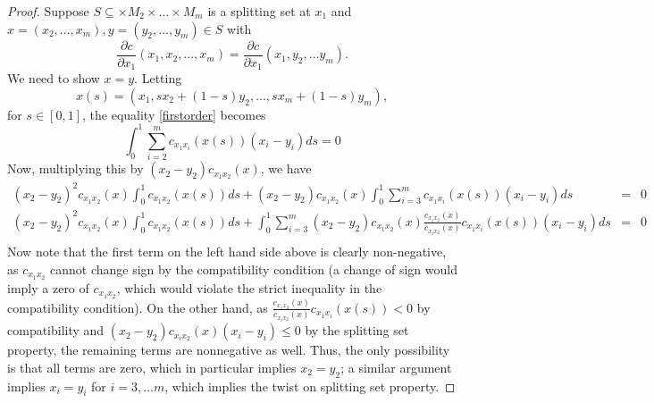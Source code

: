 \documentclass[letter,10pt]{article}
\theoremstyle{dotless}
\begin{document}
\begin{proof}
Suppose $S \subseteq\times M_2 \times...\times M_m$ is a splitting set at $x_1$  and $x=(x_2,...,x_m),y= (y_2,...,y_m) \in S$ with 
\begin{equation}\label{firstorder}
\frac{\partial c}{\partial x_1}(x_1,x_2,...,x_m) =\frac{\partial c}{\partial x_1}(x_1,y_2,...y_m) .
\end{equation}
We need to show $x=y$.  Letting 
\begin{equation*}
x(s) =(x_1, sx_2 + (1-s)y_2,...,sx_m + (1-s)y_m),
\end{equation*}
for  $ s \in [0,1]$, the equality \eqref{firstorder} becomes
\begin{equation*}
\int_0^1\sum_{i=2}^mc_{x_1x_i}(x(s))(x_i-y_i)ds =0
\end{equation*}
Now, multiplying this by $(x_2-y_2)c_{x_1x_2}(x)$, we have
\begin{eqnarray*}
(x_2-y_2)^2c_{x_1x_2} (x)\int_0^1c_{x_1x_2} (x(s))ds+(x_2-y_2)c_{x_1x_2} (x)\int_0^1\sum_{i=3}^mc_{x_1x_i} (x(s))(x_i-y_i)ds &=&0\\
(x_2-y_2)^2c_{x_1x_2}(x)\int_0^1c_{x_1x_2}(x(s))ds+\int_0^1\sum_{i=3}^m(x_2-y_2)c_{x_1x_2} (x)    \frac{  c_{x_ix_2} (x)    }{c_{x_ix_2}(x) }    c_{x_1x_i} (x(s))(x_i-y_i)ds &=&0\\
\end{eqnarray*}
Now note that the first term on the left hand side above is clearly non-negative, as $c_{x_1x_2}$ cannot change sign by the compatibility condition (a change of sign would imply  a zero of $c_{x_1x_2}$, which would violate the strict inequality in the compatibility condition).  On the other hand, as $   \frac{  c_{x_1x_2} (x)  }{c_{x_ix_2}(x) }    c_{x_1x_i} (x(s)) <0$ by compatibility and   $(x_2-y_2)c_{x_ix_2}(x)  (x_i-y_i)\leq 0$ by the splitting set property, the remaining terms are nonnegative as well.  Thus, the only possibility is that all terms are zero, which in particular implies $x_2=y_2$; a similar argument implies $x_i=y_i$ for $i=3,...m$, which implies the twist on splitting set property.
\end{proof}
\newtheorem{comprem}[onedmonge]{Remark }
\end{document}
